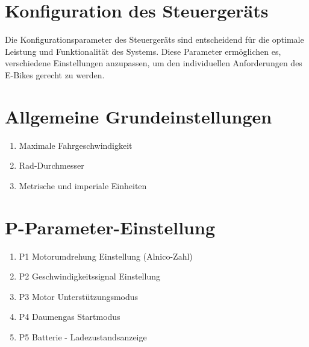 
\section{Konfiguration des Steuergeräts}

Die Konfigurationsparameter des Steuergeräts sind entscheidend für die optimale Leistung und Funktionalität des Systems. Diese Parameter ermöglichen es, verschiedene Einstellungen anzupassen, um den individuellen Anforderungen des E-Bikes gerecht zu werden. 

\section{Allgemeine Grundeinstellungen}
\begin{enumerate}[label=\arabic*.]
    \item Maximale Fahrgeschwindigkeit
    \item Rad-Durchmesser
    \item Metrische und imperiale Einheiten
\end{enumerate}

\section{P-Parameter-Einstellung}
\begin{enumerate}[label=\arabic*.]
    \item P1 Motorumdrehung Einstellung (Alnico-Zahl)
    \item P2 Geschwindigkeitssignal Einstellung
    \item P3 Motor Unterstützungsmodus
    \item P4 Daumengas Startmodus
    \item P5 Batterie - Ladezustandsanzeige
\end{enumerate}

